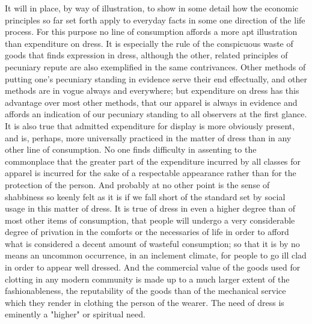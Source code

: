 \documentclass[12pt]{report}
\begin{document}
It will in place, by way of illustration, to show in some detail how the
economic principles so far set forth apply to everyday facts in some one
direction of the life process. For this purpose no line of consumption
affords a more apt illustration than expenditure on dress. It is
especially the rule of the conspicuous waste of goods that finds
expression in dress, although the other, related principles of pecuniary
repute are also exemplified in the same contrivances. Other methods
of putting one's pecuniary standing in evidence serve their end
effectually, and other methods are in vogue always and everywhere; but
expenditure on dress has this advantage over most other methods, that
our apparel is always in evidence and affords an indication of our
pecuniary standing to all observers at the first glance. It is also true
that admitted expenditure for display is more obviously present, and is,
perhaps, more universally practiced in the matter of dress than in any
other line of consumption. No one finds difficulty in assenting to the
commonplace that the greater part of the expenditure incurred by all
classes for apparel is incurred for the sake of a respectable appearance
rather than for the protection of the person. And probably at no other
point is the sense of shabbiness so keenly felt as it is if we fall
short of the standard set by social usage in this matter of dress. It
is true of dress in even a higher degree than of most other items of
consumption, that people will undergo a very considerable degree of
privation in the comforts or the necessaries of life in order to afford
what is considered a decent amount of wasteful consumption; so that
it is by no means an uncommon occurrence, in an inclement climate,
for people to go ill clad in order to appear well dressed. And the
commercial value of the goods used for clotting in any modern community
is made up to a much larger extent of the fashionableness, the
reputability of the goods than of the mechanical service which they
render in clothing the person of the wearer. The need of dress is
eminently a "higher" or spiritual need.
\end{document}
